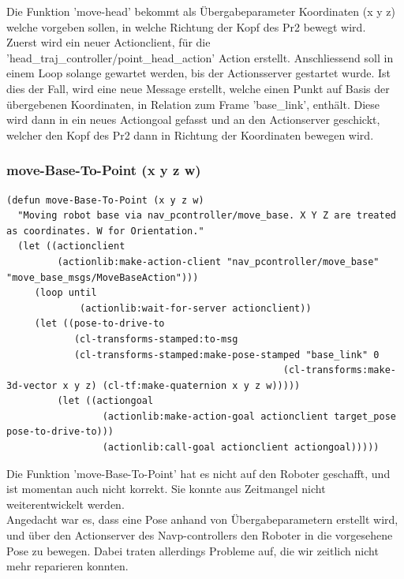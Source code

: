 \documentclass{suturo}
\begin{document}
Die Funktion 'move-head' bekommt als \"Ubergabeparameter Koordinaten (x y z) welche vorgeben sollen, in welche Richtung der Kopf des Pr2 bewegt wird.\\
Zuerst wird ein neuer Actionclient, für die 'head\_traj\_controller/point\_head\_action' Action erstellt. Anschliessend soll in einem Loop solange gewartet werden, bis der Actionsserver gestartet wurde. Ist dies der Fall, wird eine neue Message erstellt, welche einen Punkt auf Basis der \"ubergebenen Koordinaten, in Relation zum Frame 'base\_link', enth\"alt. Diese wird dann in ein neues Actiongoal gefasst und an den Actionserver geschickt, welcher den Kopf des Pr2 dann in Richtung der Koordinaten bewegen wird.


\subsubsection{move-Base-To-Point (x y z w)}

\noindent
\begin{minipage}{\linewidth}
\begin{lstlisting}
(defun move-Base-To-Point (x y z w)
  "Moving robot base via nav_pcontroller/move_base. X Y Z are treated as coordinates. W for Orientation."
  (let ((actionclient 
         (actionlib:make-action-client "nav_pcontroller/move_base" "move_base_msgs/MoveBaseAction")))
     (loop until
             (actionlib:wait-for-server actionclient))
     (let ((pose-to-drive-to 
            (cl-transforms-stamped:to-msg 
            (cl-transforms-stamped:make-pose-stamped "base_link" 0 
                                                 (cl-transforms:make-3d-vector x y z) (cl-tf:make-quaternion x y z w)))))
         (let ((actiongoal 
                 (actionlib:make-action-goal actionclient target_pose pose-to-drive-to)))
                 (actionlib:call-goal actionclient actiongoal)))))
\end{lstlisting}
\end{minipage}

Die Funktion 'move-Base-To-Point' hat es nicht auf den Roboter geschafft, und ist momentan auch nicht korrekt. Sie konnte aus Zeitmangel nicht weiterentwickelt werden.\\
Angedacht war es, dass eine Pose anhand von Übergabeparametern erstellt wird, und über den Actionserver des Navp-controllers den Roboter in die vorgesehene Pose zu bewegen. Dabei traten allerdings Probleme auf, die wir zeitlich nicht mehr reparieren konnten.
\end{document}
